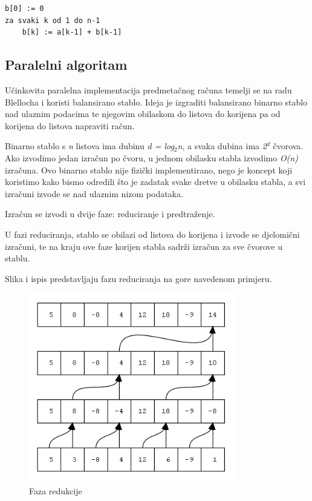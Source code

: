 \documentclass[times, utf8, zavrsni]{fer}
\begin{document}
\begin{singlespace}
\begin{lstlisting}[caption={Predmetačni zbroj},label={predmetacni zbroj}]
b[0] := 0
za svaki k od 1 do n-1
	b[k] := a[k-1] + b[k-1]
\end{lstlisting}
\end{singlespace}

\subsection{Paralelni algoritam}

\indent

Učinkovita paralelna implementacija predmetačnog računa temelji se na radu Blellocha i koristi balansirano stablo. Ideja je izgraditi balansirano binarno stablo nad ulaznim podacima te njegovim obilaskom do listova do korijena pa od korijena do listova napraviti račun.

Binarno stablo s \textit{n} listova ima dubinu \textit{d = log$_{2}$n}, a svaka dubina ima \textit{2$^{d}$} čvorova. Ako izvodimo jedan izračun po čvoru, u jednom obilasku stabla izvodimo \textit{O(n)} izračuna. Ovo binarno stablo nije fizički implementirano, nego je koncept koji koristimo kako bismo odredili što je zadatak svake dretve u obilasku stabla, a svi izračuni izvode se nad ulaznim nizom podataka.

Izračun se izvodi u dvije faze: reduciranje i predtraženje.

U fazi reduciranja, stablo se obilazi od listova do korijena i izvode se djelomični izračuni, te na kraju ove faze korijen stabla sadrži izračun za sve čvorove u stablu.

Slika i ispis predstavljaju fazu reduciranja na gore navedenom primjeru.

\begin{figure}[ht!]
\centering
\includegraphics[width=90mm]{redukcija.png}
\caption{Faza redukcije}
\label{redukcija}
\end{figure}
\end{document}
